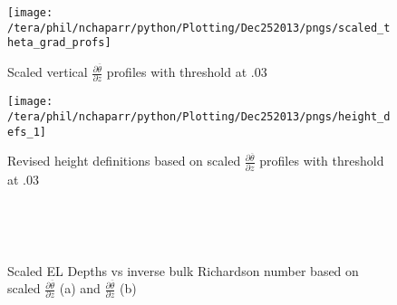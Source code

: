 \begin{figure}[htbp]
    \centering
    \texttt{[image: /tera/phil/nchaparr/python/Plotting/Dec252013/pngs/scaled\_theta\_grad\_profs]}
    \caption{Scaled vertical $\frac{\partial \overline{\theta}}{\partial z}$ profiles with threshold at .03}
    \label{fig:thresh3}   %
\end{figure}

\begin{figure}[htbp]
    \centering
    \texttt{[image: /tera/phil/nchaparr/python/Plotting/Dec252013/pngs/height\_defs\_1]}
    \caption{Revised height definitions based on scaled $\frac{\partial \overline{\theta}}{\partial z}$ profiles with threshold at .03}
    \label{fig:heightdefs1}   %
\end{figure}


\begin{figure}[htbp]
\begin{minipage}[b]{0.5\linewidth}
        \\
        \end{minipage}             
\quad
\begin{minipage}[b]{0.5\linewidth}
        \\
       
       \end{minipage}
        \caption{Scaled EL Depths vs inverse bulk Richardson number based on scaled $\frac{\partial \overline{\theta}}{\partial z}$ (a) and $\frac{\partial \overline{\theta}}{\partial z}$ (b)}
        \label{fig:ELvsri}
\end{figure}

